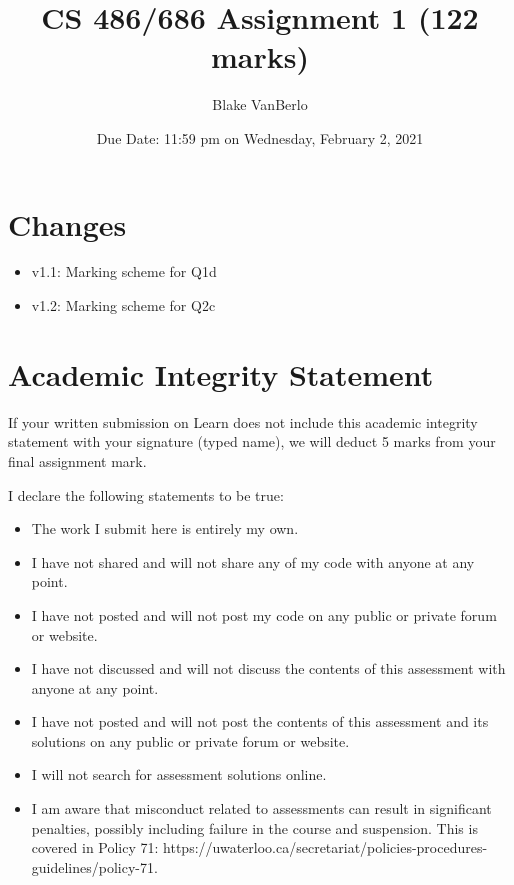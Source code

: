 \documentclass[12pt]{article}
\title{CS 486/686 Assignment 1 (122 marks) \\
}
\author{Blake VanBerlo}
\date{Due Date: 11:59 pm on Wednesday, February 2, 2021}
\begin{document}
\maketitle

\section*{Changes}

\begin{itemize}
\item v1.1: Marking scheme for Q1d
\item v1.2: Marking scheme for Q2c
\end{itemize}

\newpage
\section*{Academic Integrity Statement}

{\color{red} If your written submission on Learn does not include this academic integrity statement with your signature (typed name), we will deduct 5 marks from your final assignment mark.}

I declare the following statements to be true:

\begin{itemize}
\item 
The work I submit here is entirely my own.

\item 	
I have not shared and will not share any of my code with anyone at any point. 

\item 
I have not posted and will not post my code on any public or private forum or website.

\item 	
I have not discussed and will not discuss the contents of this assessment with anyone at any point.

\item 
I have not posted and will not post the contents of this assessment and its solutions on any public or private forum or website. 

\item 
I will not search for assessment solutions online.

\item 
I am aware that misconduct related to assessments can result in significant penalties, possibly including failure in the course and suspension. This is covered in Policy 71: https://uwaterloo.ca/secretariat/policies-procedures-guidelines/policy-71.
\end{itemize}
\end{document}
